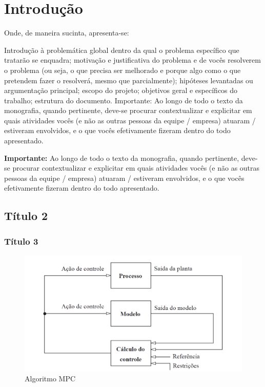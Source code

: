 \chapter{Introdução}
Onde, de maneira sucinta, apresenta-se:

Introdução à problemática global dentro da qual o problema específico que tratarão se enquadra; motivação e justificativa do problema e de vocês resolverem o problema (ou seja, o que precisa ser melhorado e porque algo como o que pretendem fazer o resolverá, mesmo que parcialmente); hipóteses levantadas ou argumentação principal; escopo do projeto; objetivos geral e específicos do trabalho; estrutura do documento.
Importante: Ao longo de todo o texto da monografia, quando pertinente, deve-se procurar contextualizar e explicitar em quais atividades vocês (e não as outras pessoas da equipe / empresa) atuaram / estiveram envolvidos, e o que vocês efetivamente fizeram dentro do todo apresentado.


\textbf{Importante:} Ao longo de todo o texto da monografia, quando pertinente, deve-se procurar contextualizar e explicitar em quais atividades vocês (e não as outras pessoas da equipe / empresa) atuaram / estiveram envolvidos, e o que vocês efetivamente fizeram dentro do todo apresentado.

\section{Título 2}

\subsection{Título 3}

\begin{figure}
	   \centering
	   		\includegraphics[scale=0.35]{figs/MPCbase.PNG} 
	   \caption{Algoritmo MPC}
	   \label{label para referencia cruzada Figura}
\end{figure}


